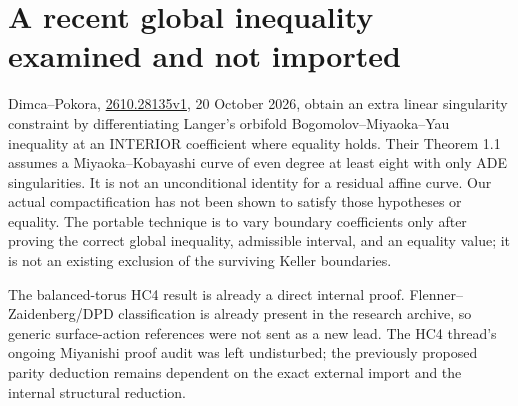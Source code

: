 \documentclass{article}
\begin{document}
\section{A recent global inequality examined and not imported}
Dimca--Pokora, \href{https://arxiv.org/abs/2610.28135v1}{2610.28135v1}, 20 October 2026, obtain an extra linear singularity constraint by differentiating Langer's orbifold Bogomolov--Miyaoka--Yau inequality at an INTERIOR coefficient where equality holds. Their Theorem 1.1 assumes a Miyaoka--Kobayashi curve of even degree at least eight with only ADE singularities. It is not an unconditional identity for a residual affine curve. Our actual compactification has not been shown to satisfy those hypotheses or equality. The portable technique is to vary boundary coefficients only after proving the correct global inequality, admissible interval, and an equality value; it is not an existing exclusion of the surviving Keller boundaries.

The balanced-torus HC4 result is already a direct internal proof. Flenner--Zaidenberg/DPD classification is already present in the research archive, so generic surface-action references were not sent as a new lead. The HC4 thread's ongoing Miyanishi proof audit was left undisturbed; the previously proposed parity deduction remains dependent on the exact external import and the internal structural reduction.
\end{document}
